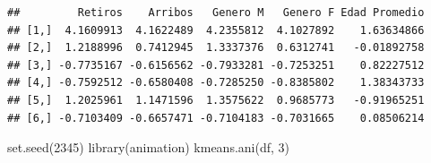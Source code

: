 \documentclass[
]{article}
\newenvironment{Shaded}{\begin{snugshade}}{\end{snugshade}}
\newcommand{\DecValTok}[1]{\textcolor[rgb]{0.00,0.00,0.81}{#1}}
\newcommand{\FunctionTok}[1]{\textcolor[rgb]{0.00,0.00,0.00}{#1}}
\newcommand{\NormalTok}[1]{#1}
\begin{document}
\begin{verbatim}
##         Retiros    Arribos   Genero M   Genero F Edad Promedio
## [1,]  4.1609913  4.1622489  4.2355812  4.1027892    1.63634866
## [2,]  1.2188996  0.7412945  1.3337376  0.6312741   -0.01892758
## [3,] -0.7735167 -0.6156562 -0.7933281 -0.7253251    0.82227512
## [4,] -0.7592512 -0.6580408 -0.7285250 -0.8385802    1.38343733
## [5,]  1.2025961  1.1471596  1.3575622  0.9685773   -0.91965251
## [6,] -0.7103409 -0.6657471 -0.7104183 -0.7031665    0.08506214
\end{verbatim}

\begin{Shaded}
\begin{Highlighting}[]
\FunctionTok{set.seed}\NormalTok{(}\DecValTok{2345}\NormalTok{)}
\FunctionTok{library}\NormalTok{(animation)}
\FunctionTok{kmeans.ani}\NormalTok{(df, }\DecValTok{3}\NormalTok{)}
\end{Highlighting}
\end{Shaded}
\end{document}
